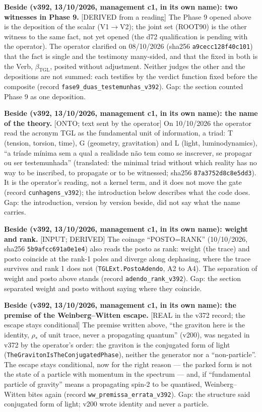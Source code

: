 \documentclass[11pt]{article}
\theoremstyle{definition}\newtheorem{deriv}{Derivation}
\begin{document}
\textbf{Beside (v392, 13/10/2026, management c1, in its own name): two witnesses in Phase 9.} \textsf{[DERIVED from a reading]} The Phase 9 opened above is the deposition of the scalar (V1$\to$V2); the joint set (ROOT90) is the other witness to the same fact, not yet opened (the d72 qualification is pending with the operator). The operator clarified on 08/10/2026 (sha256 \texttt{a9cecc128f40c101}) that the fact is single and the testimony many-sided, and that the fixed in both is the Verb, $\beta_{\mathrm{TGL}}$, posited without adjustment. Neither judges the other and the depositions are not summed: each testifies by the verdict function fixed before the composite (record \texttt{fase9\_duas\_testemunhas\_v392}). Gap: the section counted Phase 9 as one deposition.

\textbf{Beside (v392, 13/10/2026, management c1, in its own name): the name of the theory.} \textsf{[ONTO; text sent by the operator]} On 10/10/2026 the operator read the acronym TGL as the fundamental unit of information, a triad: T (tension, torsion, time), G (geometry, gravitation) and L (light, luminodynamics), ``a tríade mínima sem a qual a realidade não tem como se inscrever, se propagar ou ser testemunhada'' (translated: the minimal triad without which reality has no way to be inscribed, to propagate or to be witnessed; sha256 \texttt{87a3752d8c8e5dd3}). It is the operator's reading, not a kernel term, and it does not move the gate (record \texttt{cunhagens\_v392}); the introduction below describes what the code does. Gap: the introduction, version by version beside, did not say what the name carries.

 \textbf{Beside (v392, 13/10/2026, management c1, in its own name): weight and rank.} \textsf{[INPUT; DERIVED]} The coinage ``POSTO=RANK'' (10/10/2026, sha256 \texttt{5b9afcc691a0e1e4}) also reads the posto as rank: weight (the trace) and posto coincide at the rank-1 poles and diverge along dephasing, where the trace survives and rank 1 does not (\texttt{TGLExt.PostoAdendo}, A2 to A4). The separation of weight and posto above stands (record \texttt{adendo\_rank\_v392}). Gap: the section separated weight and posto without saying where they coincide.

 \textbf{Beside (v392, 13/10/2026, management c1, in its own name): the premise of the Weinberg--Witten escape.} \textsf{[REAL in the v372 record; the escape stays conditional]} The premise written above, ``the graviton here is the identity, $\rho_\ast$ of unit trace, never a propagating quantum'' (v200), was negated in v372 by the operator's order: the graviton is the conjugated form of light (\texttt{TheGravitonIsTheConjugatedPhase}), neither the generator nor a ``non-particle''. The escape stays conditional, now for the right reason --- the parked form is not the state of a particle with momentum in the spectrum --- and, if ``fundamental particle of gravity'' means a propagating spin-2 to be quantised, Weinberg--Witten bites again (record \texttt{ww\_premissa\_errata\_v392}). Gap: the structure said conjugated form of light; v200 wrote identity and never a particle.
\end{document}

